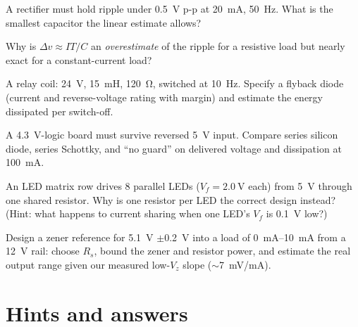 \begin{exercise}[medium]
A rectifier must hold ripple under \qty{0.5}{\volt} p-p at
\qty{20}{\milli\ampere}, \qty{50}{\hertz}. What is the smallest
capacitor the linear estimate allows?
\end{exercise}

\begin{exercise}[medium]
Why is $\Delta v\approx IT/C$ an \emph{overestimate} of the ripple for
a resistive load but nearly exact for a constant-current load?
\end{exercise}

\begin{exercise}[medium]
A relay coil: \qty{24}{\volt}, \qty{15}{\milli\henry}, \qty{120}{\ohm},
switched at \qty{10}{\hertz}. Specify a flyback diode (current and
reverse-voltage rating with margin) and estimate the energy dissipated
per switch-off.
\end{exercise}

\begin{exercise}[medium]
A \qty{4.3}{\volt}-logic board must survive reversed \qty{5}{\volt}
input. Compare series silicon diode, series Schottky, and ``no guard''
on delivered voltage and dissipation at \qty{100}{\milli\ampere}.
\end{exercise}

\begin{exercise}[hard]
An LED matrix row drives 8 parallel LEDs ($V_f=\qty{2.0}{\volt}$ each)
from \qty{5}{\volt} through one shared resistor. Why is one resistor
per LED the correct design instead? (Hint: what happens to current
sharing when one LED's $V_f$ is \qty{0.1}{\volt} low?)
\end{exercise}

\begin{exercise}[hard]
Design a zener reference for \qty{5.1}{\volt} $\pm$\qty{0.2}{\volt}
into a load of \qty{0}{\milli\ampere}--\qty{10}{\milli\ampere} from a
\qty{12}{\volt} rail: choose $R_s$, bound the zener and resistor power,
and estimate the real output range given our measured low-$V_z$ slope
($\sim$\qty{7}{\milli\volt}/mA).
\end{exercise}

\section*{Hints and answers}

